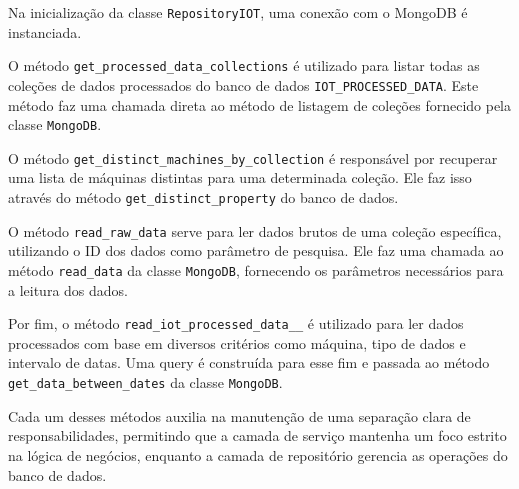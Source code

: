 Na inicialização da classe \texttt{RepositoryIOT}, uma conexão com o MongoDB é instanciada.

O método \texttt{get\_processed\_data\_collections} é utilizado para listar todas as coleções de dados processados do banco de dados \texttt{IOT\_PROCESSED\_DATA}. Este método faz uma chamada direta ao método de listagem de coleções fornecido pela classe \texttt{MongoDB}.

O método \texttt{get\_distinct\_machines\_by\_collection} é responsável por recuperar uma lista de máquinas distintas para uma determinada coleção. Ele faz isso através do método \texttt{get\_distinct\_property} do banco de dados.

O método \texttt{read\_raw\_data} serve para ler dados brutos de uma coleção específica, utilizando o ID dos dados como parâmetro de pesquisa. Ele faz uma chamada ao método \texttt{read\_data} da classe \texttt{MongoDB}, fornecendo os parâmetros necessários para a leitura dos dados.

Por fim, o método \texttt{read\_iot\_processed\_data\_\_} é utilizado para ler dados processados com base em diversos critérios como máquina, tipo de dados e intervalo de datas. Uma query é construída para esse fim e passada ao método \texttt{get\_data\_between\_dates} da classe \texttt{MongoDB}.

Cada um desses métodos auxilia na manutenção de uma separação clara de responsabilidades, permitindo que a camada de serviço mantenha um foco estrito na lógica de negócios, enquanto a camada de repositório gerencia as operações do banco de dados.



